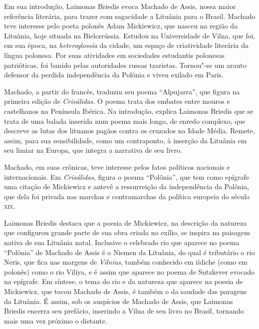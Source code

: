 Em sua introdução, Laimonas Briedis evoca Machado de Assis, nossa
maior referência literária, para trazer com sagacidade a Lituânia para
o Brasil. Machado teve interesse pelo poeta polonês Adam Mickiewicz, que
nasceu na região da Lituânia, hoje situada na Bielorrússia. Estudou na
Universidade de Vilna, que foi, em sua época, na \textit{heteroglossia} da
cidade, um espaço de criatividade literária da língua polonesa. Por suas
atividades em sociedades estudantis polonesas patrióticas, foi banido
pelas autoridades russas tzaristas. Tornou"-se um arauto defensor da
perdida independência da Polônia e viveu exilado em Paris.

Machado, a partir do francês, traduziu seu poema ``Alpujarra'', que
figura na primeira edição de \textit{Crisálidas}. O poema trata dos
embates entre mouros e castelhanos na Península Ibérica. Na introdução,
explica Laimonas Briedis que se trata de uma balada inserida num poema
mais longo, de enredo complexo, que descreve as lutas dos lituanos
pagãos contra os cruzados na Idade Média. Remete, assim, para sua
sensibilidade, como um contraponto, à inserção da Lituânia em seu limiar
na Europa, que integra a narrativa de seu livro.

Machado, em suas crônicas, teve interesse pelos fatos políticos
nacionais e internacionais. Em \textit{Crisálidas}, figura o poema
``Polônia'', que tem como epígrafe uma citação de Mickiewicz e antevê a
ressurreição da independência da Polônia, que dela foi privada nas
marchas e contramarchas da política europeia do século \textsc{xix}.

Laimonas Briedis destaca que a poesia de Mickiewicz, na descrição da
natureza que configurou grande parte de sua obra criada no exílio, se
inspira na paisagem nativa de sua Lituânia natal. Inclusive o celebrado
rio que aparece no poema ``Polônia'' de Machado de Assis é o Niemen da
Lituânia, do qual é tributário o rio Neris, que fica nas margens de
\textit{Vilnius}, também conhecido em iídiche (como em polonês) como o rio
Viliya, e é assim que aparece no poema de Sutzkever evocado na epígrafe.
Em síntese, o tema do rio e da natureza que aparece na poesia de
Mickiewicz, que tocou Machado de Assis, é também o da saudade das
paragens da Lituânia. É assim, sob os auspícios de Machado de Assis, que
Laimonas Briedis encerra seu prefácio, inserindo a Vilna de seu livro no
Brasil, tornando mais uma vez próximo o distante.

